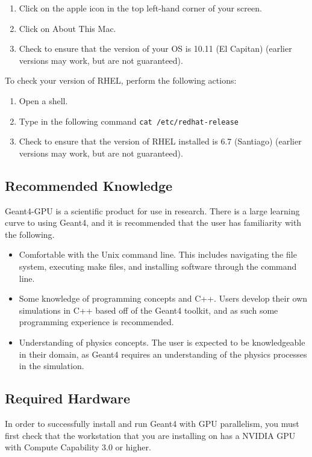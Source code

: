 \documentclass[12pt]{article}
\begin{document}
\begin{enumerate}
\item Click on the apple icon in the top left-hand corner of your screen.
\item Click on About This Mac.
\item Check to ensure that the version of your OS is 10.11 (El Capitan) (earlier versions may work, but are not guaranteed).
\end{enumerate}

To check your version of RHEL, perform the following actions:
\begin{enumerate}
\item Open a shell.
\item Type in the following command \texttt{cat /etc/redhat-release}
\item Check to ensure that the version of RHEL installed is 6.7 (Santiago) (earlier versions may work, but are not guaranteed).
\end{enumerate}

\subsection{Recommended Knowledge} %
Geant4-GPU is a scientific product for use in research. There is a large learning curve to using Geant4, and it is recommended that the user has familiarity with the following.
\begin{itemize}
\item Comfortable with the Unix command line. This includes navigating the file system, executing make files, and installing software through the command line.
\item Some knowledge of programming concepts and C++. Users develop their own simulations in C++ based off of the Geant4 toolkit, and as such some programming experience is recommended.
\item Understanding of physics concepts. The user is expected to be knowledgeable in their domain, as Geant4 requires an understanding of the physics processes in the simulation.
\end{itemize}

\subsection{Required Hardware} \label{SecCardReqs}%
In order to successfully install and run Geant4 with GPU parallelism, you must first check that the workstation that you are installing on has a NVIDIA GPU with Compute Capability 3.0 or higher.\\
\end{document}
